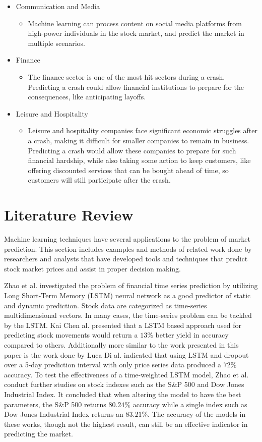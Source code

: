 \documentclass{article}
\begin{document}
\newpage
	\begin{itemize}
		\item Communication and Media
			\begin{itemize}
				\item Machine learning can process content on social media platforms from high-power individuals in the stock market, and predict the market in multiple scenarios.   
			\end{itemize}
		\item Finance
			\begin{itemize}
				\item The finance sector is one of the most hit sectors during a crash. Predicting a crash could allow financial institutions to prepare for the consequences, like anticipating layoffs.
			\end{itemize}
		\item Leisure and Hospitality 
			\begin{itemize}
				\item Leisure and hospitality companies face significant economic struggles after a crash, making it difficult for smaller companies to remain in business. Predicting a crash would allow these companies to prepare for such financial hardship, while also taking some action to keep customers, like offering discounted services that can be bought ahead of time, so customers will still participate after the crash. 
			\end{itemize}
	\end{itemize}
 
\section{Literature Review} 
Machine learning techniques have several applications to the problem of market prediction. This section includes examples and methods of related work done by researchers and analysts that have developed tools and techniques that predict stock market prices and assist in proper decision making.

Zhao et al. investigated the problem of financial time series prediction by utilizing Long Short-Term Memory (LSTM) neural network as a good predictor of static and dynamic prediction. Stock data are categorized as time-series multidimensional vectors. In many cases, the time-series problem can be tackled by the LSTM. Kai Chen al. presented that a LSTM based approach used for predicting stock movements would return a $13\%$ better yield in accuracy compared to others. Additionally more similar to the work presented in this paper is the work done by Luca Di al. indicated that using LSTM and dropout over a 5-day prediction interval with only price series data produced a $72\%$ accuracy. To test the effectiveness of a time-weighted LSTM model, Zhao et al. conduct further studies on stock indexes such as the S\&P 500 and Dow Jones Industrial Index. It concluded that when altering the model to have the best parameters, the S\&P 500 returns $80.24\%$ accuracy while a single index such as Dow Jones Industrial Index returns an $83.21\%$. The accuracy of the models in these works, though not the highest result, can still be an effective indicator in predicting the market. 
\end{document}
